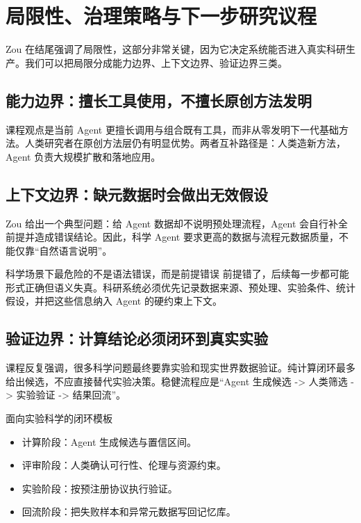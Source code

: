 \section{局限性、治理策略与下一步研究议程}

Zou 在结尾强调了局限性，这部分非常关键，因为它决定系统能否进入真实科研生产。我们可以把局限分成能力边界、上下文边界、验证边界三类。

\subsection{能力边界：擅长工具使用，不擅长原创方法发明}

课程观点是当前 Agent 更擅长调用与组合既有工具，而非从零发明下一代基础方法。人类研究者在原创方法层仍有明显优势。两者互补路径是：人类造新方法，Agent 负责大规模扩散和落地应用。

\subsection{上下文边界：缺元数据时会做出无效假设}

Zou 给出一个典型问题：给 Agent 数据却不说明预处理流程，Agent 会自行补全前提并造成错误结论。因此，科学 Agent 要求更高的数据与流程元数据质量，不能仅靠``自然语言说明''。

\begin{warningbox}{科学场景下最危险的不是语法错误，而是前提错误}
前提错了，后续每一步都可能形式正确但语义失真。科研系统必须优先记录数据来源、预处理、实验条件、统计假设，并把这些信息纳入 Agent 的硬约束上下文。
\end{warningbox}

\subsection{验证边界：计算结论必须闭环到真实实验}

课程反复强调，很多科学问题最终要靠实验和现实世界数据验证。纯计算闭环最多给出候选，不应直接替代实验决策。稳健流程应是``Agent 生成候选 -> 人类筛选 -> 实验验证 -> 结果回流''。

\begin{knowledgebox}{面向实验科学的闭环模板}
\begin{itemize}
    \item 计算阶段：Agent 生成候选与置信区间。
    \item 评审阶段：人类确认可行性、伦理与资源约束。
    \item 实验阶段：按预注册协议执行验证。
    \item 回流阶段：把失败样本和异常元数据写回记忆库。
\end{itemize}
\end{knowledgebox}

